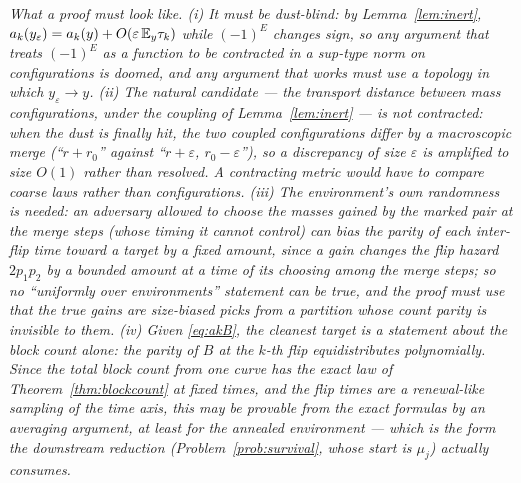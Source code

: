 \medskip
\emph{What a proof must look like.  (i) It must be dust-blind: by
Lemma~\ref{lem:inert}, $a_k(y_\varepsilon)=a_k(y)+O(\varepsilon\,\mathbb{E}_y\tau_k)$
while $(-1)^{E}$ changes sign, so any argument that treats $(-1)^E$ as
a function to be contracted in a sup-type norm on configurations is
doomed, and any argument that works must use a topology in which
$y_\varepsilon\to y$.  (ii) The natural candidate --- the transport
distance between mass configurations, under the coupling of
Lemma~\ref{lem:inert} --- is not contracted: when the dust is finally
hit, the two coupled configurations differ by a macroscopic merge
(``$r+r_0$'' against ``$r+\varepsilon$, $r_0-\varepsilon$''), so a
discrepancy of size $\varepsilon$ is amplified to size $O(1)$ rather
than resolved.  A contracting metric would have to compare coarse
\emph{laws} rather than configurations.  (iii) The environment's own
randomness is needed: an adversary allowed to choose the masses gained
by the marked pair at the merge steps (whose timing it cannot control)
can bias the parity of each inter-flip time toward a target by a fixed
amount, since a gain changes the flip hazard $2p_1p_2$ by a bounded
amount at a time of its choosing among the merge steps; so no
``uniformly over environments'' statement can be true, and the proof
must use that the true gains are size-biased picks from a partition
whose count parity is invisible to them.  (iv) Given
\eqref{eq:akB}, the cleanest target is a statement about the block
count alone: the parity of $B$ at the $k$-th flip equidistributes
polynomially.  Since the total block count from one curve has the
exact law of Theorem~\ref{thm:blockcount} at fixed times, and the flip
times are a renewal-like sampling of the time axis, this may be
provable from the exact formulas by an averaging argument, at least
for the annealed environment --- which is the form the downstream
reduction (Problem~\ref{prob:survival}, whose start is
$\mu_j$) actually consumes.}
